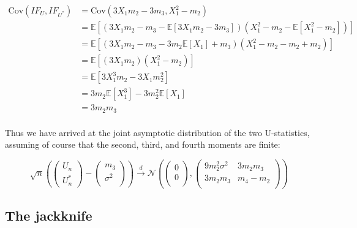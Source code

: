 \documentclass{report}
\begin{document}
\begin{equation}\label{eq:ex-lst-u-statistic-joint-if-covariance}
    \begin{aligned}
        \text{Cov}\left(IF_U, IF_{U^*}\right)
          &= \text{Cov}\left(3X_1m_2 - 3m_3, X_1^2 - m_2\right) \\
          &= \mathbb{E}\left[\left(3X_1m_2 - m_3 - \mathbb{E}[3X_1m_2 - 3m_3]\right)\left(X_1^2 - m_2 - \mathbb{E}[X_1^2 - m_2]\right)\right] \\ 
          &= \mathbb{E}\left[\left(3X_1m_2 - m_3 - 3m_2\mathbb{E}[X_1] + m_3\right)\left(X_1^2 - m_2 - m_2 + m_2\right)\right] \\
          &= \mathbb{E}\left[(3X_1m_2)(X_1^2 - m_2)\right] \\
          &= \mathbb{E}\left[3X_1^3m_2 - 3X_1m_2^2\right] \\
          &= 3m_2\mathbb{E}[X_1^3] - 3m_2^2\mathbb{E}[X_1] \\
          &= 3m_2m_3 \\
    \end{aligned}
\end{equation}

Thus we have arrived at the joint asymptotic distribution of the two U-statistics, assuming of course that the second, third, and fourth moments are finite:

\begin{equation}\label{eq:ex-lst-u-statistic-joint-asymptotics}
    \sqrt{n}\left(\begin{pmatrix}
        U_n \\
        U_n^*
    \end{pmatrix} - \begin{pmatrix}
        m_3 \\
        \sigma^2 \\
    \end{pmatrix}\right) \overset{d}{\to} \mathcal{N}\left(\begin{pmatrix}
        0 \\
        0 \\
    \end{pmatrix}, \begin{pmatrix}
        9m_2^2\sigma^2 & 3m_2m_3 \\
        3m_2m_3 & m_4 - m_2 \\
    \end{pmatrix}\right)
\end{equation}

\subsection{The jackknife}
\end{document}
